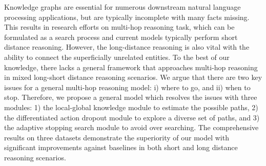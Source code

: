Knowledge graphs are essential for numerous downstream natural language processing applications, but are typically incomplete with many facts missing. This results in research efforts on multi-hop reasoning task, which can be formulated as a search process and current models typically perform short distance reasoning. However, the long-distance reasoning is also vital with the ability to connect the superficially unrelated entities. To the best of our knowledge, there lacks a general framework that approaches multi-hop reasoning in mixed long-short distance reasoning scenarios. We argue that there are two key issues for a general multi-hop reasoning model: i) where to go, and ii) when to stop. Therefore, we propose a general model which resolves the issues with three modules: 1) the local-global knowledge module to estimate the possible paths, 2) the differentiated action dropout module to explore a diverse set of paths, and 3) the adaptive stopping search module to avoid over searching. The comprehensive results on three datasets demonstrate the superiority of our model with significant improvements against baselines in both short and long distance reasoning scenarios.
